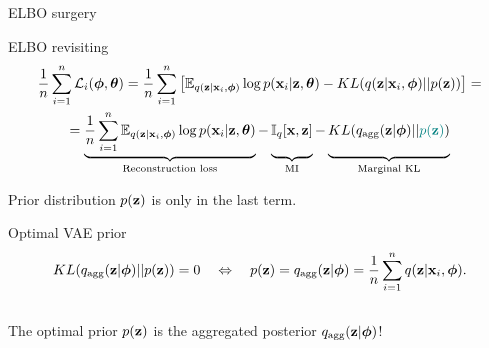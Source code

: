 \begin{frame}{ELBO surgery}
	\begin{block}{ELBO revisiting}
		\vspace{-0.7cm}
		{\small
		\begin{multline*}
		    \frac{1}{n}\sum_{i=1}^n \cL_i(\bphi, \btheta) = \frac{1}{n} \sum_{i=1}^n \left[ \mathbb{E}_{q(\bz | \bx_i, \bphi)} \log p(\bx_i | \bz, \btheta) - KL(q(\bz | \bx_i, \bphi) || p(\bz)) \right] = \\
		    = \underbrace{\frac{1}{n} \sum_{i=1}^n \mathbb{E}_{q(\bz | \bx_i, \bphi)} \log p(\bx_i | \bz, \btheta)}_{\text{Reconstruction loss}} - \underbrace{\vphantom{ \sum_{i=1}^n} \bbI_q [\bx, \bz]}_{\text{MI}} - \underbrace{\vphantom{ \sum_{i=1}^n} KL(q_{\text{agg}}(\bz | \bphi) || {\color{teal}p(\bz)})}_{\text{Marginal KL}}
		\end{multline*}
		}
		\vspace{-0.3cm}
	\end{block}
	Prior distribution $p(\mathbf{z})$ is only in the last term.
	\begin{block}{Optimal VAE prior}
		\vspace{-0.7cm}
		\[
	  		KL(q_{\text{agg}}(\mathbf{z} | \boldsymbol{\phi}) || p(\mathbf{z})) = 0 \quad \Leftrightarrow \quad p (\mathbf{z}) = q_{\text{agg}}(\mathbf{z} | \boldsymbol{\phi}) = \frac{1}{n} \sum_{i=1}^n q(\mathbf{z} | \mathbf{x}_i, \boldsymbol{\phi}).
		\]
		\vspace{-0.4cm} \\
		The optimal prior $p(\mathbf{z})$ is the aggregated posterior $q_{\text{agg}}(\mathbf{z} | \boldsymbol{\phi})$!
	\end{block}
	
\end{frame}
